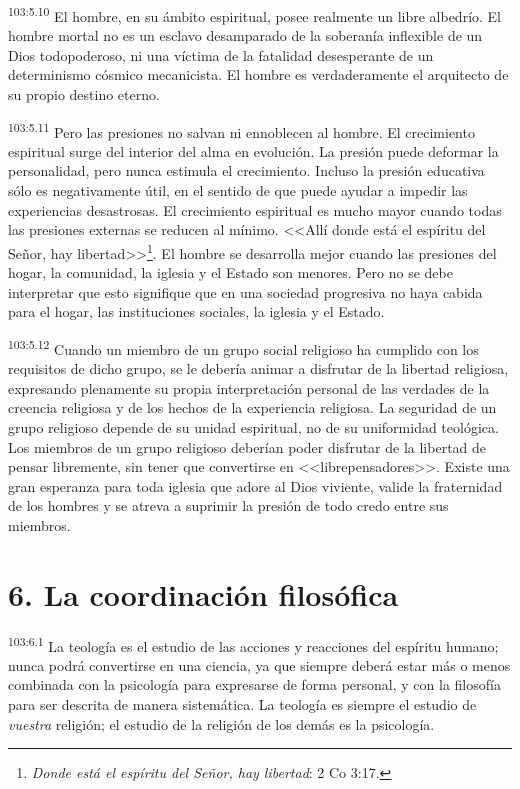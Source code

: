 \documentclass[twoside, 11pt]{book}
\begin{document}
\par
\textsuperscript{103:5.10} El hombre, en su ámbito espiritual, posee realmente un libre albedrío. El hombre mortal no es un esclavo desamparado de la soberanía inflexible de un Dios todopoderoso, ni una víctima de la fatalidad desesperante de un determinismo cósmico mecanicista. El hombre es verdaderamente el arquitecto de su propio destino eterno.

\par
\textsuperscript{103:5.11} Pero las presiones no salvan ni ennoblecen al hombre. El crecimiento espiritual surge del interior del alma en evolución. La presión puede deformar la personalidad, pero nunca estimula el crecimiento. Incluso la presión educativa sólo es negativamente útil, en el sentido de que puede ayudar a impedir las experiencias desastrosas. El crecimiento espiritual es mucho mayor cuando todas las presiones externas se reducen al mínimo. <<Allí donde está el espíritu del Señor, hay libertad>>\footnote{\textit{Donde está el espíritu del Señor, hay libertad}: 2 Co 3:17.}. El hombre se desarrolla mejor cuando las presiones del hogar, la comunidad, la iglesia y el Estado son menores. Pero no se debe interpretar que esto signifique que en una sociedad progresiva no haya cabida para el hogar, las instituciones sociales, la iglesia y el Estado.

\par
\textsuperscript{103:5.12} Cuando un miembro de un grupo social religioso ha cumplido con los requisitos de dicho grupo, se le debería animar a disfrutar de la libertad religiosa, expresando plenamente su propia interpretación personal de las verdades de la creencia religiosa y de los hechos de la experiencia religiosa. La seguridad de un grupo religioso depende de su unidad espiritual, no de su uniformidad teológica. Los miembros de un grupo religioso deberían poder disfrutar de la libertad de pensar libremente, sin tener que convertirse en <<librepensadores>>. Existe una gran esperanza para toda iglesia que adore al Dios viviente, valide la fraternidad de los hombres y se atreva a suprimir la presión de todo credo entre sus miembros.

\section*{6. La coordinación filosófica}
\par
\textsuperscript{103:6.1} La teología es el estudio de las acciones y reacciones del espíritu humano; nunca podrá convertirse en una ciencia, ya que siempre deberá estar más o menos combinada con la psicología para expresarse de forma personal, y con la filosofía para ser descrita de manera sistemática. La teología es siempre el estudio de \textit{vuestra} religión; el estudio de la religión de los demás es la psicología.
\end{document}
